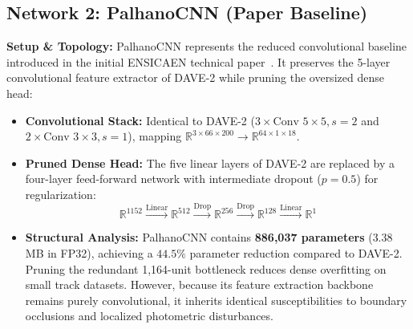\documentclass[10pt,journal,compsoc]{IEEEtran}
\begin{document}
\subsection{Network 2: PalhanoCNN (Paper Baseline)}
\textbf{Setup \& Topology:} PalhanoCNN represents the reduced convolutional baseline introduced in the initial ENSICAEN technical paper~\cite{palhano2026kart}. It preserves the 5-layer convolutional feature extractor of DAVE-2 while pruning the oversized dense head:
\begin{itemize}
    \item \textbf{Convolutional Stack:} Identical to DAVE-2 ($3 \times \text{Conv } 5 \times 5, s=2$ and $2 \times \text{Conv } 3 \times 3, s=1$), mapping $\mathbb{R}^{3 \times 66 \times 200} \to \mathbb{R}^{64 \times 1 \times 18}$.
    \item \textbf{Pruned Dense Head:} The five linear layers of DAVE-2 are replaced by a four-layer feed-forward network with intermediate dropout ($p = 0.5$) for regularization:
    \begin{equation}
    \mathbb{R}^{1152} \xrightarrow{\text{Linear}} \mathbb{R}^{512} \xrightarrow{\text{Drop}} \mathbb{R}^{256} \xrightarrow{\text{Drop}} \mathbb{R}^{128} \xrightarrow{\text{Linear}} \mathbb{R}^1
    \end{equation}
    \item \textbf{Structural Analysis:} PalhanoCNN contains \textbf{886,037 parameters} ($3.38$\,MB in FP32), achieving a $44.5\%$ parameter reduction compared to DAVE-2. Pruning the redundant 1,164-unit bottleneck reduces dense overfitting on small track datasets. However, because its feature extraction backbone remains purely convolutional, it inherits identical susceptibilities to boundary occlusions and localized photometric disturbances.
\end{itemize}
\end{document}
